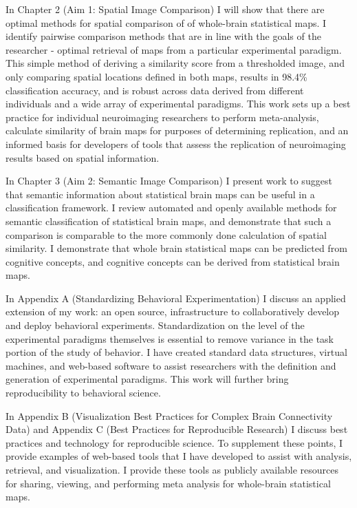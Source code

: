 \documentclass{report}
\begin{document}
In Chapter 2 (Aim 1: Spatial Image Comparison) I will show that there
are optimal methods for spatial comparison of of whole-brain statistical
maps. I identify pairwise comparison methods that are in line with the
goals of the researcher - optimal retrieval of maps from a particular
experimental paradigm. This simple method of deriving a similarity score
from a thresholded image, and only comparing spatial locations defined
in both maps, results in 98.4\% classification accuracy, and is robust
across data derived from different individuals and a wide array of
experimental paradigms. This work sets up a best practice for individual
neuroimaging researchers to perform meta-analysis, calculate similarity
of brain maps for purposes of determining replication, and an informed
basis for developers of tools that assess the replication of
neuroimaging results based on spatial information.

In Chapter 3 (Aim 2: Semantic Image Comparison) I present work to
suggest that semantic information about statistical brain maps can be
useful in a classification framework. I review automated and openly
available methods for semantic classification of statistical brain maps,
and demonstrate that such a comparison is comparable to the more
commonly done calculation of spatial similarity. I demonstrate that whole brain statistical maps can be predicted from cognitive concepts, and cognitive concepts can be derived from statistical brain maps.

In Appendix A (Standardizing Behavioral Experimentation) I discuss
an applied extension of my work: an open source, infrastructure to
collaboratively develop and deploy behavioral experiments. Standardization on the level of the experimental paradigms themselves is essential to remove variance in the task portion of the study of behavior. I have
created standard data structures, virtual machines, and web-based
software to assist researchers with the definition and generation of
experimental paradigms. This work will further bring reproducibility to
behavioral science.

In Appendix B (Visualization Best Practices for Complex Brain Connectivity Data) and Appendix C (Best Practices for Reproducible Research) I discuss
best practices and technology for reproducible science. To supplement
these points, I provide examples of web-based tools that I have
developed to assist with analysis, retrieval, and visualization. I
provide these tools as publicly available resources for sharing,
viewing, and performing meta analysis for whole-brain statistical maps.
\end{document}
